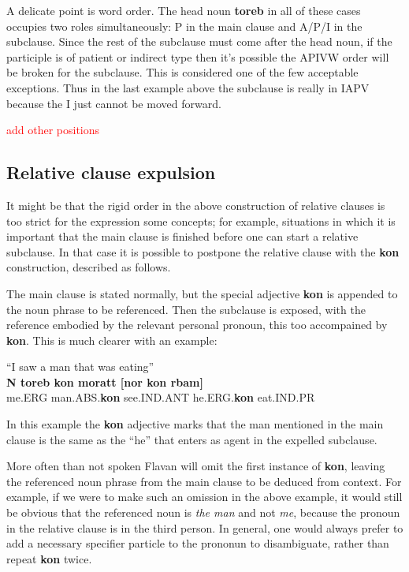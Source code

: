 \documentclass[10pt,oneside]{memoir}
\newcommand{\cmmnt}[1]{\textcolor{red}{#1}}
\begin{document}
A delicate point is word order. The head noun \textbf{toreb} in all of these cases occupies two roles simultaneously: P in the main clause and A/P/I in the subclause. Since the rest of the subclause must come after the head noun, if the participle is of patient or indirect type then it's possible the APIVW order will be broken for the subclause. This is considered one of the few acceptable exceptions. Thus in the last example above the subclause is really in IAPV because the I just cannot be moved forward.

\cmmnt{add other positions}

\subsection{Relative clause expulsion}

It might be that the rigid order in the above construction of relative clauses is too strict for the expression some concepts; for example, situations in which it is important that the main clause is finished before one can start a relative subclause. In that case it is possible to postpone the relative clause with the \textbf{kon} construction, described as follows.

The main clause is stated normally, but the special adjective \textbf{kon} is appended to the noun phrase to be referenced. Then the subclause is exposed, with the reference embodied by the relevant personal pronoun, this too accompained by \textbf{kon}. This is much clearer with an example:

\begin{center}
    ``I saw a man that was eating''\\
    \textbf{N toreb kon moratt [nor kon rbam]}\\
    me.ERG man.ABS.\textbf{kon} see.IND.ANT he.ERG.\textbf{kon} eat.IND.PR
\end{center}

In this example the \textbf{kon} adjective marks that the man mentioned in the main clause is the same as the ``he'' that enters as agent in the expelled subclause.

More often than not spoken Flavan will omit the first instance of \textbf{kon}, leaving the referenced noun phrase from the main clause to be deduced from context. For example, if we were to make such an omission in the above example, it would still be obvious that the referenced noun is \emph{the man} and not \emph{me}, because the pronoun in the relative clause is in the third person. In general, one would always prefer to add a necessary specifier particle to the prononun to disambiguate, rather than repeat \textbf{kon} twice.
\end{document}
